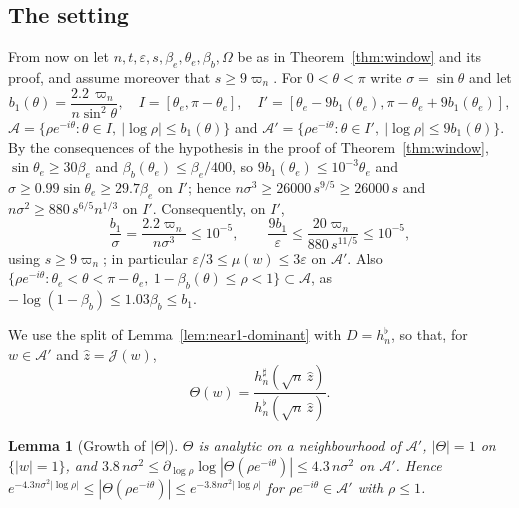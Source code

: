 \documentclass[11pt]{amsart}
\newtheorem{lemma}[theorem]{Lemma}
\theoremstyle{definition}
\theoremstyle{remark}
\numberwithin{equation}{section}
\newcommand{\eps}{\varepsilon}
\begin{document}
\subsection{The setting}\label{subsec:near1-setting}
From now on let $n,t,\eps,s,\beta_e,\theta_e,\beta_b,\Omega$ be as in Theorem~\ref{thm:window} and its proof, and assume moreover that $s\ge9\varpi_n$. For $0<\theta<\pi$ write $\sigma=\sin\theta$ and let
\[
b_1(\theta)=\frac{2.2\,\varpi_n}{n\sin^2\theta},\quad I=[\theta_e,\pi-\theta_e],\quad I'=[\theta_e-9b_1(\theta_e),\pi-\theta_e+9b_1(\theta_e)],
\]
$\mathcal A=\{\rho e^{-i\theta}:\theta\in I,\ |\log\rho|\le b_1(\theta)\}$ and $\mathcal A'=\{\rho e^{-i\theta}:\theta\in I',\ |\log\rho|\le9b_1(\theta)\}$. By the consequences of the hypothesis in the proof of Theorem~\ref{thm:window}, $\sin\theta_e\ge30\beta_e$ and $\beta_b(\theta_e)\le\beta_e/400$, so $9b_1(\theta_e)\le10^{-3}\theta_e$ and $\sigma\ge0.99\sin\theta_e\ge29.7\beta_e$ on $I'$; hence $n\sigma^3\ge26000\,s^{9/5}\ge26000\,s$ and $n\sigma^2\ge880\,s^{6/5}n^{1/3}$ on $I'$. Consequently, on $I'$,
\[
\frac{b_1}\sigma=\frac{2.2\varpi_n}{n\sigma^3}\le10^{-5},\qquad\frac{9b_1}\eps\le\frac{20\varpi_n}{880\,s^{11/5}}\le10^{-5},
\]
using $s\ge9\varpi_n$; in particular $\eps/3\le\mu(w)\le3\eps$ on $\mathcal A'$. Also $\{\rho e^{-i\theta}:\theta_e<\theta<\pi-\theta_e,\ 1-\beta_b(\theta)\le\rho<1\}\subset\mathcal A$, as $-\log(1-\beta_b)\le1.03\beta_b\le b_1$.

We use the split of Lemma~\ref{lem:near1-dominant} with $D=h_n^\flat$, so that, for $w\in\mathcal A'$ and $\hat z=\mathcal J(w)$,
\[
\Theta(w)=\frac{h_n^\sharp(\sqrt n\,\hat z)}{h_n^\flat(\sqrt n\,\hat z)} .
\]

\begin{lemma}[Growth of $|\Theta|$]\label{lem:near1-growth}
$\Theta$ is analytic on a neighbourhood of $\mathcal A'$, $|\Theta|=1$ on $\{|w|=1\}$, and $3.8\,n\sigma^2\le\partial_{\log\rho}\log|\Theta(\rho e^{-i\theta})|\le4.3\,n\sigma^2$ on $\mathcal A'$. Hence $e^{-4.3n\sigma^2|\log\rho|}\le|\Theta(\rho e^{-i\theta})|\le e^{-3.8n\sigma^2|\log\rho|}$ for $\rho e^{-i\theta}\in\mathcal A'$ with $\rho\le1$.
\end{lemma}
\end{document}
